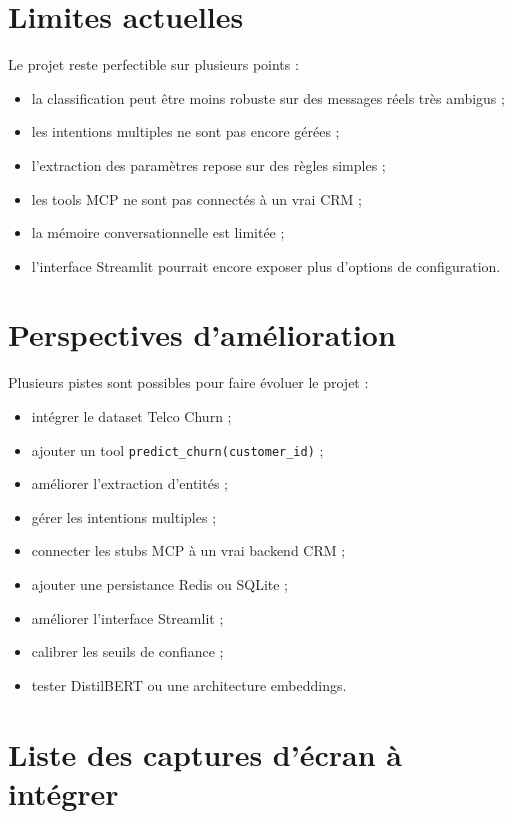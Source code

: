 \documentclass[12pt,a4paper]{report}
\begin{document}
\section{Limites actuelles}

Le projet reste perfectible sur plusieurs points :

\begin{itemize}
    \item la classification peut être moins robuste sur des messages réels très ambigus ;
    \item les intentions multiples ne sont pas encore gérées ;
    \item l'extraction des paramètres repose sur des règles simples ;
    \item les tools MCP ne sont pas connectés à un vrai CRM ;
    \item la mémoire conversationnelle est limitée ;
    \item l'interface Streamlit pourrait encore exposer plus d'options de configuration.
\end{itemize}

\section{Perspectives d'amélioration}

Plusieurs pistes sont possibles pour faire évoluer le projet :

\begin{itemize}
    \item intégrer le dataset Telco Churn ;
    \item ajouter un tool \texttt{predict\_churn(customer\_id)} ;
    \item améliorer l'extraction d'entités ;
    \item gérer les intentions multiples ;
    \item connecter les stubs MCP à un vrai backend CRM ;
    \item ajouter une persistance Redis ou SQLite ;
    \item améliorer l'interface Streamlit ;
    \item calibrer les seuils de confiance ;
    \item tester DistilBERT ou une architecture embeddings.
\end{itemize}

\section{Liste des captures d'écran à intégrer}
\end{document}
